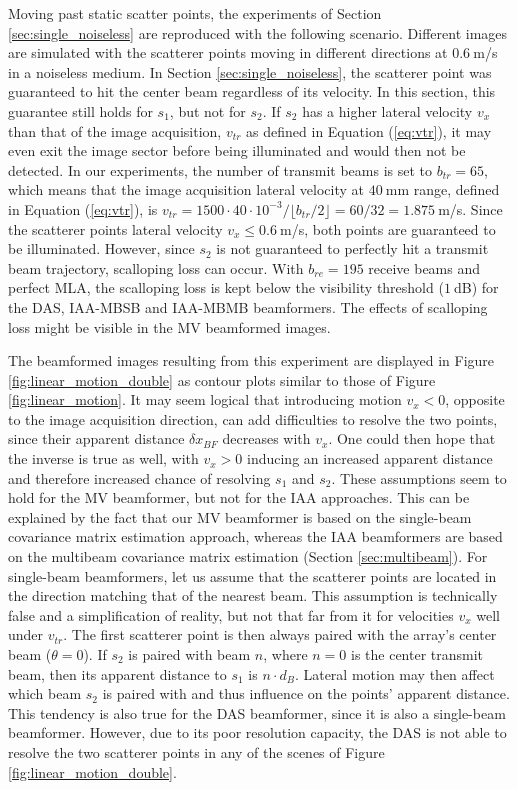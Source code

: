 Moving past static scatter points, the experiments of Section \ref{sec:single_noiseless} are reproduced with the following scenario.  Different images are simulated with the scatterer points moving in different directions at $0.6~$m/s in a noiseless medium.
In Section \ref{sec:single_noiseless}, the scatterer point was guaranteed to hit the center beam regardless of its velocity. In this section, this guarantee still holds for $s_1$, but not for $s_2$. If $s_2$ has a higher lateral velocity $v_x$ than that of the image acquisition, $v_{tr}$ as defined in Equation (\ref{eq:vtr}), it may even exit the image sector before being illuminated and would then not be detected. In our experiments, the number of transmit beams is set to $b_{tr} = 65$, which means that the image acquisition lateral velocity at $40~$mm range, defined in Equation (\ref{eq:vtr}), is $v_{tr} = 1500 \cdot 40 \cdot 10^{-3} / \lfloor b_{tr} / 2 \rfloor = 60 / 32 = 1.875~$m/s. Since the scatterer points lateral velocity $v_x \leq 0.6~$m/s, both points are guaranteed to be illuminated.
However, since $s_2$ is not guaranteed to perfectly hit a transmit beam trajectory, scalloping loss can occur. With $b_{re} = 195$ receive beams and perfect MLA, the scalloping loss is kept below the visibility threshold ($1~$dB) for the DAS, IAA-MBSB and IAA-MBMB beamformers. The effects of scalloping loss might be visible in the MV beamformed images.

The beamformed images resulting from this experiment are displayed in Figure \ref{fig:linear_motion_double} as contour plots similar to those of Figure \ref{fig:linear_motion}.
It may seem logical that introducing motion $v_x < 0$, opposite to the image acquisition direction, can add difficulties to resolve the two points, since their apparent distance $\delta x_{BF}$ decreases with $v_x$. One could then hope that the inverse is true as well, with $v_x > 0$ inducing an increased apparent distance and therefore increased chance of resolving $s_1$ and $s_2$. 
These assumptions seem to hold for the MV beamformer, but not for the IAA approaches. This can be explained by the fact that our MV beamformer is based on the single-beam covariance matrix estimation approach, whereas the IAA beamformers are based on the multibeam covariance matrix estimation (Section \ref{sec:multibeam}).
For single-beam beamformers, let us assume that the scatterer points are located in the direction matching that of the nearest beam. This assumption is technically false and a simplification of reality, but not that far from it for velocities $v_x$ well under $v_{tr}$. The first scatterer point is then always paired with the array's center beam ($\theta = 0$). If $s_2$ is paired with beam $n$, where $n=0$ is the center transmit beam, then its apparent distance to $s_1$ is $n \cdot d_B$. Lateral motion may then affect which beam $s_2$ is paired with and thus influence on the points' apparent distance.
This tendency is also true for the DAS beamformer, since it is also a single-beam beamformer. However, due to its poor resolution capacity, the DAS is not able to resolve the two scatterer points in any of the scenes of Figure \ref{fig:linear_motion_double}.

